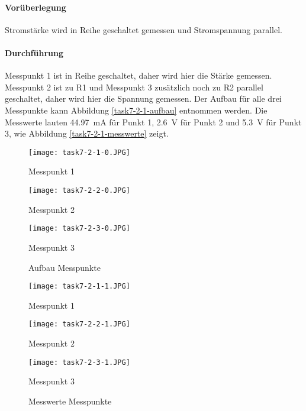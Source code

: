 \paragraph{Vorüberlegung}
Stromstärke wird in Reihe geschaltet gemessen und Stromspannung parallel.

\paragraph{Durchführung}
Messpunkt 1 ist in Reihe geschaltet, daher wird hier die Stärke gemessen. Messpunkt 2 ist zu R1 und Messpunkt 3 zusätzlich noch zu R2 parallel geschaltet, daher wird hier die Spannung gemessen. Der Aufbau für alle drei Messpunkte kann Abbildung \vref{task7-2-1-aufbau} entnommen werden. Die Messwerte lauten \SI{44.97}{\milli\ampere} für Punkt 1, \SI{2,6}{\volt} für Punkt 2 und \SI{5,3}{\volt} für Punkt 3, wie Abbildung \vref{task7-2-1-messwerte} zeigt.

\begin{figure}
	\begin{minipage}[c]{0.325\linewidth}
		\texttt{[image: task7-2-1-0.JPG]}
		\caption{Messpunkt 1}
		\label{task7-2-1-0}
	\end{minipage}
	\hfill
	\begin{minipage}[c]{0.3\linewidth}
		\texttt{[image: task7-2-2-0.JPG]}
		\caption{Messpunkt 2}
		\label{task7-2-2-0}
	\end{minipage}
	\hfill
	\begin{minipage}[c]{0.345\linewidth}
		\texttt{[image: task7-2-3-0.JPG]}
		\caption{Messpunkt 3}
		\label{task7-2-3-0}
	\end{minipage}
	\caption{Aufbau Messpunkte}
	\label{task7-2-1-aufbau}
\end{figure}

\begin{figure}
	\begin{minipage}[c]{0.325\linewidth}
		\texttt{[image: task7-2-1-1.JPG]}
		\caption{Messpunkt 1}
		\label{task7-2-1-1}
	\end{minipage}
	\hfill
	\begin{minipage}[c]{0.305\linewidth}
		\texttt{[image: task7-2-2-1.JPG]}
		\caption{Messpunkt 2}
		\label{task7-2-2-1}
	\end{minipage}
	\hfill
	\begin{minipage}[c]{0.33\linewidth}
		\texttt{[image: task7-2-3-1.JPG]}
		\caption{Messpunkt 3}
		\label{task7-2-3-1}
	\end{minipage}
	\caption{Messwerte Messpunkte}
	\label{task7-2-1-messwerte}
\end{figure}

